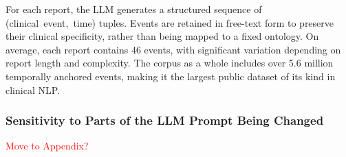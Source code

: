 

For each report, the LLM generates a structured sequence of \mbox{(clinical event, time)} tuples. Events are retained in free-text form to preserve their clinical specificity, rather than being mapped to a fixed ontology. On average, each report contains 46 events, with significant variation depending on report length and complexity. The corpus as a whole includes over 5.6 million temporally anchored events, making it the largest public dataset of its kind in clinical NLP.

\subsubsection{Sensitivity to Parts of the LLM Prompt Being Changed} \textcolor{red}{Move to Appendix?}

